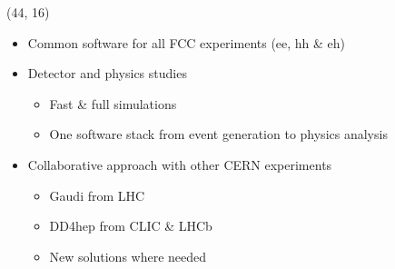\documentclass[final,xcolor={dvipsnames,svgnames,x11names,table}]{beamer}
\begin{document}
\begin{frame}
\begin{textblock}{43}
\begin{tcolorbox}[title=The Future Circular Collider Experiment (FCC)]
  \end{tcolorbox}
\end{textblock}

\begin{textblock}{39.5}(44, 16)
  \begin{tcolorbox}[title=FCCSW: Physics and Detector simulations with FCCSW]

  \vspace{0.5cm}
  \begin{itemize}
    \item Common software for all FCC experiments (ee, hh \& eh) \vspace{0.5cm}
    \item Detector and physics studies \vspace{0.5cm}
      \begin{itemize}
        \item Fast \& full simulations
        \item One software stack from event generation to physics analysis \vspace{0.5cm}
      \end{itemize}
    \item Collaborative approach with other CERN experiments \vspace{0.5cm}
      \begin{itemize}
        \item Gaudi from LHC
        \item DD4hep from CLIC \& LHCb
        \item New solutions where needed
      \end{itemize}

  \end{itemize}



  \vspace{1cm}

  \centering
     \vspace{0.5cm}
  \end{tcolorbox}
\end{textblock}


\end{frame}
\end{document}
